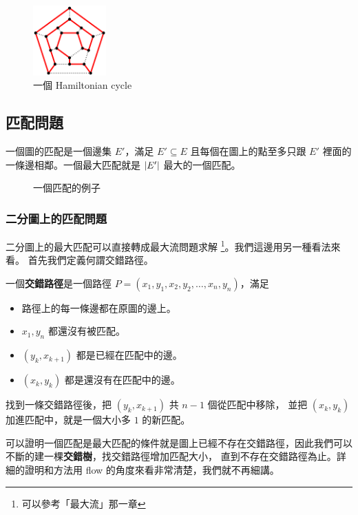 \documentclass[a4paper,12pt]{book}
\begin{document}
\begin{figure}[H]
  \centering
  \includegraphics[width=0.25\textwidth]{tikz/hamilt.png}
  \caption{一個 Hamiltonian cycle}
\end{figure}


\subsection{匹配問題}
一個圖的匹配是一個邊集 $E'$，滿足 $E' \subseteq E$ 且每個在圖上的點至多只跟
$E'$ 裡面的一條邊相鄰。一個最大匹配就是 $\lvert E' \rvert$ 最大的一個匹配。

\begin{figure}[H]
  \centering
  
  \caption{一個匹配的例子}
\end{figure}

\subsubsection{二分圖上的匹配問題}
二分圖上的最大匹配可以直接轉成最大流問題求解
\footnote{可以參考「最大流」那一章}。我們這邊用另一種看法來看。
首先我們定義何謂交錯路徑。
\begin{theorem}[定義]
  一個{\bf 交錯路徑}是一個路徑 $P = (x_1, y_1, x_2, y_2, \dots, x_n, y_n)$，滿足
  \begin{itemize}
    \item 路徑上的每一條邊都在原圖的邊上。
    \item $x_1, y_n$ 都還沒有被匹配。
    \item $(y_k, x_{k+1})$ 都是已經在匹配中的邊。
    \item $(x_k, y_{k})$ 都是還沒有在匹配中的邊。
  \end{itemize}
  找到一條交錯路徑後，把 $(y_k, x_{k+1})$ 共 $n-1$ 個從匹配中移除，
  並把 $(x_k, y_k)$ 加進匹配中，就是一個大小多 $1$ 的新匹配。
\end{theorem}

\begin{figure}[H]
  \centering
  
\end{figure}

可以證明一個匹配是最大匹配的條件就是圖上已經不存在交錯路徑，因此我們可以
不斷的建一棵{\bf 交錯樹}，找交錯路徑增加匹配大小，
直到不存在交錯路徑為止。詳細的證明和方法用
flow 的角度來看非常清楚，我們就不再細講。
\end{document}
